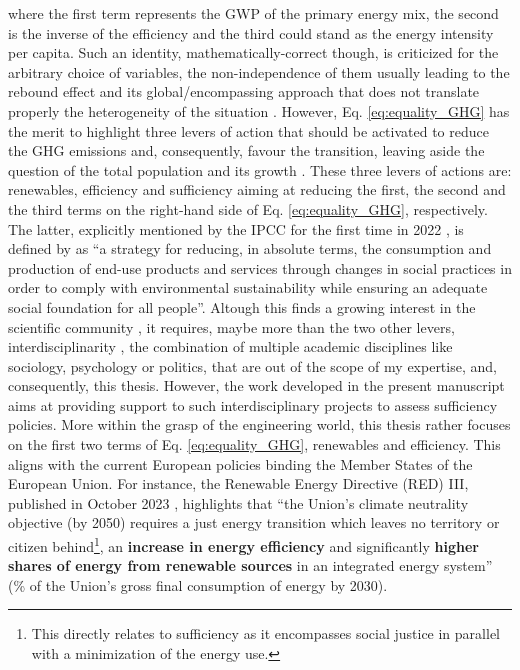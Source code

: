 \noindent
where the first term represents the \gls{GWP} of the primary energy mix, the second is the inverse of the efficiency and the third could stand as the energy intensity per capita. Such an identity, mathematically-correct though, is criticized for the arbitrary choice of variables, the non-independence of them usually leading to the rebound effect and its global/encompassing approach that does not translate properly the heterogeneity of the situation \cite{IPCC2000}. However, Eq. \ref{eq:equality_GHG} has the merit to highlight three levers of action that should be activated to reduce the \gls{GHG} emissions and, consequently, favour the transition, leaving aside the question of the total population and its growth \cite{dodson2020population,scovronick2017impact}. These three levers of actions are: renewables, efficiency and sufficiency aiming at reducing the first, the second and the third terms on the right-hand side of Eq. \ref{eq:equality_GHG}, respectively. The latter, explicitly mentioned by the IPCC for the first time in 2022 \cite{IPCC2022}, is defined by \citet{lage2023citizens} as ``a strategy for reducing, in absolute terms, the consumption and production of end-use products and services through changes in social practices in order to comply with environmental sustainability while ensuring an adequate social foundation for all people''. Altough this finds a growing interest in the scientific community \cite{o2018good}, it requires, maybe more than the two other levers, interdisciplinarity \cite{schmidt2015interdisciplinary}, \ie the combination of multiple academic disciplines like sociology, psychology or politics, that are out of the scope of my expertise, and, consequently, this thesis. However, the work developed in the present manuscript aims at providing support to such interdisciplinary projects to assess sufficiency policies. More within the grasp of the engineering world, this thesis rather focuses on the first two terms of Eq. \ref{eq:equality_GHG}, \ie renewables and efficiency. This aligns with the current European policies binding the Member States of the European Union. For instance, the Renewable Energy Directive (RED) III, published in October 2023 \cite{REDIII}, highlights that ``the Union’s climate neutrality objective (by 2050) requires a just energy transition which leaves no territory or citizen behind\footnote{This directly relates to sufficiency as it encompasses social justice in parallel with a minimization of the energy use.}, an \textbf{increase in energy efficiency} and significantly \textbf{higher shares of energy from renewable sources} in an integrated energy system'' (\% of the Union's gross final consumption of energy by 2030). 

